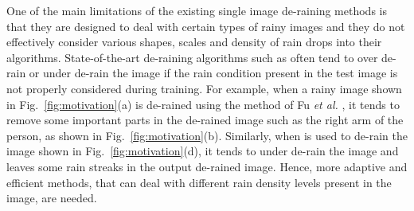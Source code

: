 \documentclass[10pt,twocolumn,letterpaper]{article}
\begin{document}
One of the main limitations of the existing single image de-raining methods is that they are designed to deal with certain types of rainy images and they do not effectively consider various shapes, scales and density of rain drops into their algorithms.   State-of-the-art de-raining algorithms such as \cite{derain_cvpr2017_multi,derain_cvpr2017} often tend to over de-rain or under de-rain the image if the rain condition present in the test image is not properly considered during training. 
For example, when a rainy image shown in Fig.~\ref{fig:motivation}(a) is de-rained using the method of Fu \emph{et al.} \cite{derain_cvpr2017}, it tends to remove some important parts  in the de-rained image such as the right arm of the person, as shown in Fig.~\ref{fig:motivation}(b).  Similarly, when \cite{derain_cvpr2017_multi} is used to de-rain the image shown in Fig.~\ref{fig:motivation}(d), it tends to under de-rain the image and leaves some rain streaks in the output de-rained image. Hence, more adaptive and efficient methods, that can deal with different rain density levels present in the image, are needed.    
\end{document}
